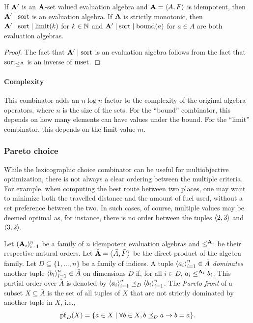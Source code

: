\begin{lemma}[Validity]
    If \(\mathbf{A}'\) is an \(\mathbf{A}\)-set valued evaluation algebra and \(\mathbf{A} = \left\langle A, F\right\rangle\) is idempotent, then \(\mathbf{A}' \mid \mathrm{sort}\) is an evaluation algebra.
    If \(\mathbf{A}\) is strictly monotonic, then \(\mathbf{A}' \mid \mathrm{sort} \mid \mathrm{limit}(k)\) for \(k \in \mathbb{N}\) and \(\mathbf{A}' \mid \mathrm{sort} \mid \mathrm{bound}(a)\) for \(a \in A\) are both evaluation algebras.
\end{lemma}
\begin{proof}
    The fact that \(\mathbf{A}' \mid \mathrm{sort}\) is an evaluation algebra follows from the fact that \(\operatorname{sort}_{\le^{\mathbf{A}}}\) is an inverse of \(\operatorname{mset}\).
\end{proof}

\paragraph{Complexity} This combinator adds an \(n\log n\) factor to the complexity of the original algebra operators, where \(n\) is the size of the sets.
For the \enquote{bound} combinator, this depends on how many elements can have values under the bound.
For the \enquote{limit} combinator, this depends on the limit value \(m\).

\subsubsection{Pareto choice}\label{sec:adp:alg-combin:pareto}

While the lexicographic choice combinator can be useful for multiobjective optimization, there is not always a clear ordering between the multiple criteria.
For example, when computing the best route between two places, one may want to minimize both the travelled distance and the amount of fuel used, without a set preference between the two.
In such cases, of course, multiple values may be deemed optimal as, for instance, there is no order between the tuples \(\left\langle2, 3\right\rangle\) and \(\left\langle3, 2\right\rangle\).

\begin{definition}
    Let \((\mathbf{A}_i)_{i=1}^n\) be a family of \(n\) idempotent evaluation algebras and \(\le^{\mathbf{A}_i}\) be their respective natural orders.
    Let \(\bar{\mathbf{A}} = \left\langle\bar A, \bar F\right\rangle\) be the direct product of the algebra family.
    Let \(D \subseteq \{1, \ldots, n\}\) be a family of indices.
    A tuple \(\left\langle a_i\right\rangle_{i=1}^n \in \bar A\) \emph{dominates} another tuple \(\left\langle b_i\right\rangle_{i=1}^n \in \bar A\) on dimensions \(D\) if, for all \(i \in D\), \(a_i \le^{\mathbf{A}_i} b_i\).
    This partial order over \(\bar A\) is denoted by \(\left\langle a_i\right\rangle_{i=1}^n \preceq_D \left\langle b_i\right\rangle_{i=1}^n\).
    The \emph{Pareto front} of a subset \(X \subseteq \bar A\) is the set of all tuples of \(X\) that are not strictly dominated by another tuple in \(X\), i.e., \[
        \operatorname{pf}_D(X) = \{
            a \in X \mid \forall b \in X,
            b \preceq_D a \rightarrow b = a
        \}. \qedhere
    \]
\end{definition}

